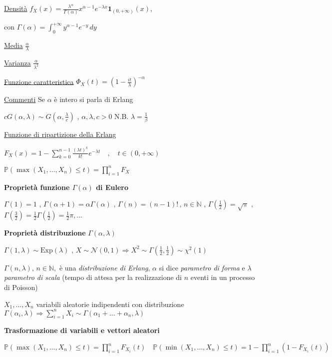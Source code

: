 \documentclass[openany]{book} %
\begin{document}
\begin{multicols}{2}
	\underline{Densità} $f_X(x) = \frac{\lambda^\alpha}{\Gamma(\alpha)}x^{\alpha-1}e^{-\lambda x}\boldsymbol{1}_{(0,+\infty)}(x)$,

	con $\Gamma(\alpha)=\int_0^{+\infty} y^{\alpha-1}e^{-y}\,dy$

	\underline{Media} $\frac{\alpha}{\lambda}$

	\underline{Varianza} $\frac{\alpha}{\lambda^2}$

	\underline{Funzione caratteristica} $\Phi_X(t)=\left(1-\frac{it}{\lambda}\right)^{-\alpha}$

	\underline{Commenti} Se $\alpha$ è intero si parla di Erlang

	$cG(\alpha, \lambda)\sim G(\alpha,\frac{\lambda}{c})$ , $\alpha,\lambda,c>0$ N.B. $\lambda=\frac{1}{\beta}$

	\underline{Funzione di ripartizione della Erlang}

	$F_X(x)=1-\sum_{k=0}^{n-1}\frac{(\lambda t)^k}{k!}e^{-\lambda t} \quad , \quad t\in(0,+\infty)$

\end{multicols}

$\mathbb{P}(\max(X_1,\dots,X_n)\leq t) = \prod_{i=1}^nF_X$

\textbf{Proprietà funzione $\Gamma(\alpha)$ di Eulero}

$\Gamma(1)=1$ , \quad
$\Gamma(\alpha+1) = \alpha\Gamma(\alpha)$ , \quad
$\Gamma(n)=(n-1)!\,,\,n\in \mathbb{N}$ , \quad
$\Gamma(\frac{1}{2})=\sqrt {\pi}$ , \quad
$\Gamma(\frac{3}{2})=\frac{1}{2}\Gamma(\frac{1}{2})=\frac{1}{2}\pi,\dots$

\textbf{Proprietà distribuzione} $\Gamma(\alpha,\lambda)$

$\Gamma(1,\lambda) \sim \text{Exp}(\lambda)$ , \quad $X\sim \mathcal {N}(0,1)\Rightarrow X^2\sim\Gamma(\frac{1}{2},\frac{1}{2})\sim\chi^2(1)$

$\Gamma(n,\lambda),\,n\in \mathbb{N},$ è una \textit{distribuzione di Erlang}, $\alpha$ si dice \textit{parametro di forma} e $\lambda$ \textit{parametro di scala} (tempo di attesa per la realizzazione di $n$ eventi in un processo di Poisson)

$X_1,\dots,X_n$ variabili aleatorie indipendenti con distribuzione $\Gamma(\alpha_i,\lambda)\Rightarrow \sum_{i=1}^nX_i\sim\Gamma(\alpha_1+\dots+\alpha_n,\lambda)$

\textbf{Trasformazione di variabili e vettori aleatori}

$\mathbb{P}(\max(X_1,\dots,X_n)\leq t)=\prod_{i=1}^nF_{X_i}(t) \quad \mathbb{P}(\min(X_1,\dots,X_n)\leq t)=1-\prod_{i=1}^n(1-F_{X_i}(t))$
\end{document}
